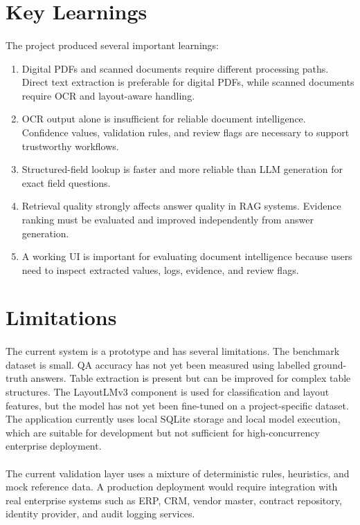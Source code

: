 \section{Key Learnings}
\paragraph{} The project produced several important learnings:

\begin{enumerate}
    \item Digital PDFs and scanned documents require different processing paths. Direct text extraction is preferable for digital PDFs, while scanned documents require OCR and layout-aware handling.
    \item OCR output alone is insufficient for reliable document intelligence. Confidence values, validation rules, and review flags are necessary to support trustworthy workflows.
    \item Structured-field lookup is faster and more reliable than LLM generation for exact field questions.
    \item Retrieval quality strongly affects answer quality in RAG systems. Evidence ranking must be evaluated and improved independently from answer generation.
    \item A working UI is important for evaluating document intelligence because users need to inspect extracted values, logs, evidence, and review flags.
\end{enumerate}

\section{Limitations}
\paragraph{} The current system is a prototype and has several limitations. The benchmark dataset is small. QA accuracy has not yet been measured using labelled ground-truth answers. Table extraction is present but can be improved for complex table structures. The LayoutLMv3 component is used for classification and layout features, but the model has not yet been fine-tuned on a project-specific dataset. The application currently uses local SQLite storage and local model execution, which are suitable for development but not sufficient for high-concurrency enterprise deployment.

\paragraph{} The current validation layer uses a mixture of deterministic rules, heuristics, and mock reference data. A production deployment would require integration with real enterprise systems such as ERP, CRM, vendor master, contract repository, identity provider, and audit logging services.

